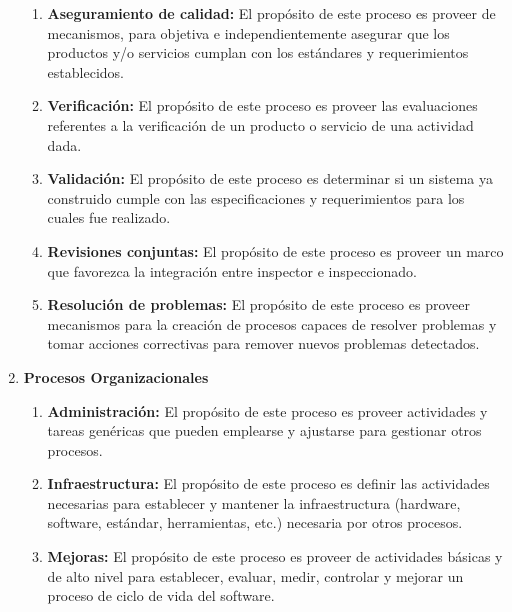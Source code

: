 \documentclass{article}
\begin{document}
\begin{enumerate}
\begin{enumerate}
        \item \textbf{Aseguramiento de calidad: }El propósito de este
        proceso es proveer de mecanismos, para objetiva e independientemente
        asegurar que los productos y/o servicios cumplan con los estándares y
        requerimientos establecidos.

        \item \textbf{Verificación: }El propósito de este proceso es
        proveer las evaluaciones referentes a la verificación de un producto o
        servicio de una actividad dada.

        \item \textbf{Validación: }El propósito de este proceso es
        determinar si un sistema ya construido cumple con las especificaciones y
        requerimientos para los cuales fue realizado.

        \item \textbf{Revisiones conjuntas: }El propósito de este
        proceso es proveer un marco que favorezca la integración entre inspector
        e inspeccionado.

        \item \textbf{Resolución de problemas: }El propósito de este
        proceso es proveer mecanismos para la creación de procesos capaces de
        resolver problemas y tomar acciones correctivas para remover nuevos
        problemas detectados.
    \end{enumerate}
    \item \textbf{Procesos Organizacionales}
        \begin{enumerate}
            \item \textbf{Administración: }El propósito de este
            proceso es proveer actividades y tareas genéricas que pueden
            emplearse y ajustarse para gestionar otros procesos.

            \item \textbf{Infraestructura: }El propósito de este
            proceso es definir las actividades necesarias para establecer y
            mantener la infraestructura (hardware, software, estándar,
            herramientas, etc.) necesaria por otros procesos.

            \item \textbf{Mejoras: }El propósito de este proceso es
            proveer de actividades básicas y de alto nivel para establecer,
            evaluar, medir, controlar y mejorar un proceso de ciclo de vida del
            software.


\end{enumerate}
\end{enumerate}
\end{document}
